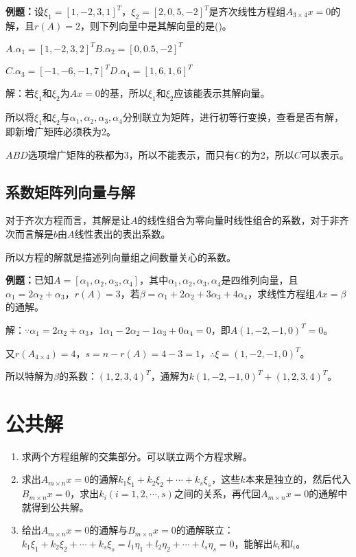\documentclass[UTF8, 12pt]{ctexart}
\begin{document}
\textbf{例题：}设$\xi_1=[1,-2,3,1]^T$，$\xi_2=[2,0,5,-2]^T$是齐次线性方程组$A_{3\times4}x=0$的解，且$r(A)=2$，则下列向量中是其解向量的是()。

$A.\alpha_1=[1,-2,3,2]^T$\qquad$B.\alpha_2=[0,0.5,-2]^T$

$C.\alpha_3=[-1,-6,-1,7]^T$\qquad$D.\alpha_4=[1,6,1,6]^T$

解：若$\xi_1$和$\xi_2$为$Ax=0$的基，所以$\xi_1$和$\xi_2$应该能表示其解向量。

所以将$\xi_1$和$\xi_2$与$\alpha_1,\alpha_2,\alpha_3,\alpha_4$分别联立为矩阵，进行初等行变换，查看是否有解，即新增广矩阵必须秩为2。

$ABD$选项增广矩阵的秩都为3，所以不能表示，而只有$C$的为2，所以$C$可以表示。

\subsection{系数矩阵列向量与解}

对于齐次方程而言，其解是让$A$的线性组合为零向量时线性组合的系数，对于非齐次而言解是$b$由$A$线性表出的表出系数。

所以方程的解就是描述列向量组之间数量关心的系数。

\textbf{例题：}已知$A=[\alpha_1,\alpha_2,\alpha_3,\alpha_4]$，其中$\alpha_1,\alpha_2,\alpha_3,\alpha_4$是四维列向量，且$\alpha_1=2\alpha_2+\alpha_3$，$r(A)=3$，若$\beta=\alpha_1+2\alpha_2+3\alpha_3+4\alpha_4$，求线性方程组$Ax=\beta$的通解。

解：$\because\alpha_1=2\alpha_2+\alpha_3$，$1\alpha_1-2\alpha_2-1\alpha_3+0\alpha_4=0$，即$A(1,-2,-1,0)^T=0$。

又$r(A_{4\times4})=4$，$s=n-r(A)=4-3=1$，$\therefore\xi=(1,-2,-1,0)^T$。

所以特解为$\beta$的系数：$(1,2,3,4)^T$，通解为$k(1,-2,-1,0)^T+(1,2,3,4)^T$。

\section{公共解}

\begin{enumerate}
    \item 求两个方程组解的交集部分。可以联立两个方程求解。
    \item 求出$A_{m\times n}x=0$的通解$k_1\xi_1+k_2\xi_2+\cdots+k_s\xi_s$，这些$k$本来是独立的，然后代入$B_{m\times n}x=0$，求出$k_i(i=1,2,\cdots,s)$之间的关系，再代回$A_{m\times n}x=0$的通解中就得到公共解。
    \item 给出$A_{m\times n}x=0$的通解与$B_{m\times n}x=0$的通解联立：$k_1\xi_1+k_2\xi_2+\cdots+k_s\xi_s=l_1\eta_1+l_2\eta_2+\cdots+l_s\eta_s=0$，能解出$k_i$和$l_i$。
\end{enumerate}
\end{document}
